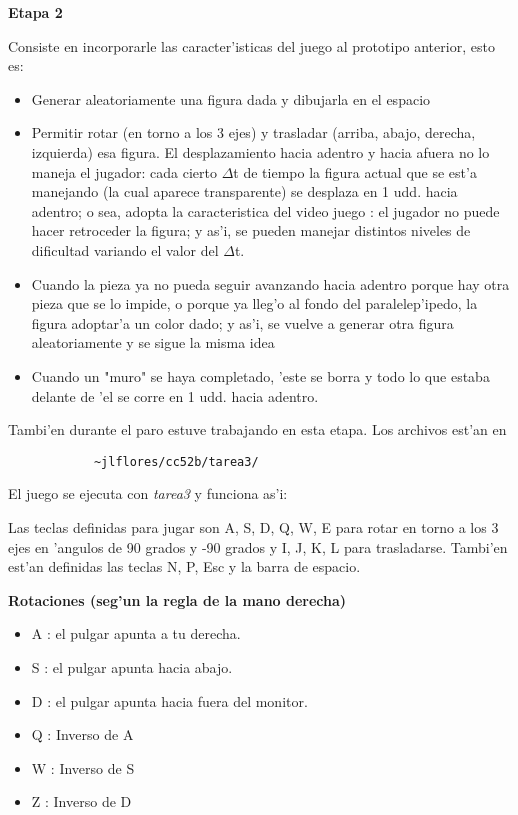 {\large\bf Etapa 2}

 Consiste en incorporarle las caracter'isticas del juego al prototipo anterior, esto es:
 
\begin{itemize} 
    \item Generar aleatoriamente una figura dada y dibujarla en el espacio
    \item Permitir rotar (en torno a los 3 ejes) y trasladar (arriba, abajo, derecha, izquierda)
     esa figura.
      El desplazamiento hacia adentro y hacia afuera  no lo maneja el jugador: cada cierto $\Delta$t de
     tiempo la figura actual que se est'a manejando (la cual aparece transparente)
     se desplaza en 1 udd. hacia adentro; o sea, adopta la caracteristica del video
     juego : el jugador no puede hacer retroceder la figura; y as'i, se pueden
     manejar distintos niveles de dificultad variando el valor del $\Delta$t.
    \item Cuando la pieza ya no pueda seguir avanzando hacia adentro porque hay otra
     pieza que se lo impide, o porque ya lleg'o al fondo del paralelep'ipedo, la
     figura adoptar'a un color dado; y as'i, se vuelve a generar otra figura
     aleatoriamente y se sigue la misma idea
    \item Cuando un "muro" se haya completado, 'este se borra y todo lo que estaba delante
     de 'el se corre en 1 udd. hacia adentro.
\end{itemize}
     
     Tambi'en durante el paro estuve trabajando en esta etapa.
     Los archivos est'an en
\begin{verbatim}
            ~jlflores/cc52b/tarea3/
\end{verbatim}        
El juego se ejecuta con {\em tarea3} y funciona as'i:

Las teclas definidas para jugar son A, S, D, Q, W, E para rotar en torno a los 3 ejes en 'angulos de 90 grados y -90
grados y I, J, K, L para trasladarse. Tambi'en est'an definidas las teclas N, P, Esc y la barra de espacio.

\newpage 
{\bf Rotaciones (seg'un la regla de la mano derecha)}
\begin{itemize}   
   \item  A : el pulgar apunta a tu derecha.
    \item S : el pulgar apunta hacia abajo.
    \item D : el pulgar apunta hacia fuera del monitor.

    \item Q : Inverso de A
    \item W : Inverso de S
    \item Z : Inverso de D
\end{itemize}

